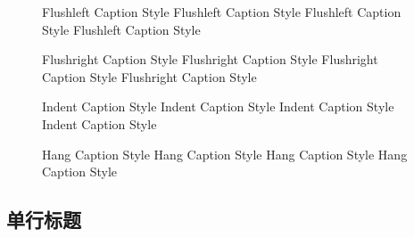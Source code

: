 \begin{figure}
	\begin{minipage}[t]{.45\textwidth}
		\vspace{0pt}
		\setcaptionmargin{5pt}
		\centering
		\resizebox{4cm}{!}{\usebox{\graphic}}
		\caption{Flushleft Caption Style Flushleft Caption Style
			Flushleft Caption Style Flushleft Caption Style}\label{fig:fleftcap}
	\end{minipage}%
	\begin{minipage}[t]{.45\textwidth}
		\vspace{0pt}
		\setcaptionmargin{5pt}
		\centering
		\resizebox{4cm}{!}{\usebox{\graphic}}
		\caption{Flushright Caption Style Flushright Caption Style 
			Flushright Caption Style Flushright Caption Style}\label{frightcap}
	\end{minipage}
\end{figure}

\begin{figure}
	\begin{minipage}[t]{.45\textwidth}
		\vspace{0pt}
		\setcaptionmargin{5pt}
		\centering
		\resizebox{4cm}{!}{\usebox{\graphic}}
		\caption{Indent Caption Style Indent Caption Style
			Indent Caption Style Indent Caption Style}\label{fig:indentcap}
	\end{minipage}%
	\begin{minipage}[t]{.45\textwidth}
		\vspace{0pt}
		\setcaptionmargin{5pt}
		\centering
		\resizebox{4cm}{!}{\usebox{\graphic}}
		\caption{Hang Caption Style Hang Caption Style
			Hang Caption Style Hang Caption Style}\label{fig:hangcap}
	\end{minipage}
\end{figure}

\subsection{单行标题}\label{ssec:onelinecaption}

